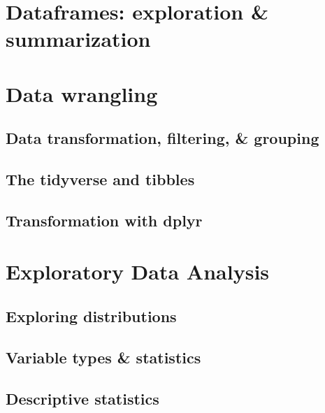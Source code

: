 \documentclass[
]{book}
\begin{document}
\hypertarget{dataframes-exploration-summarization}{%
\section{Dataframes: exploration \& summarization}\label{dataframes-exploration-summarization}}

\hypertarget{data-wrangling}{%
\section{Data wrangling}\label{data-wrangling}}

\hypertarget{data-transformation-filtering-grouping}{%
\subsection{Data transformation, filtering, \& grouping}\label{data-transformation-filtering-grouping}}

\hypertarget{the-tidyverse-and-tibbles}{%
\subsection{The tidyverse and tibbles}\label{the-tidyverse-and-tibbles}}

\hypertarget{transformation-with-dplyr}{%
\subsection{Transformation with dplyr}\label{transformation-with-dplyr}}

\hypertarget{exploratory-data-analysis}{%
\section{Exploratory Data Analysis}\label{exploratory-data-analysis}}

\hypertarget{exploring-distributions}{%
\subsection{Exploring distributions}\label{exploring-distributions}}

\hypertarget{variable-types-statistics}{%
\subsection{Variable types \& statistics}\label{variable-types-statistics}}

\hypertarget{descriptive-statistics}{%
\subsection{Descriptive statistics}\label{descriptive-statistics}}
\end{document}
